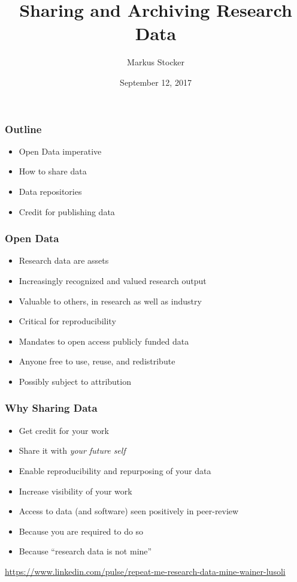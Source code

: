 \documentclass{beamer}
\title{Sharing and Archiving Research Data}
\author{Markus Stocker}
\date{September 12, 2017}
\begin{document}
\maketitle

\begin{frame}
  \frametitle{Outline}
  
  \begin{itemize}
  \item Open Data imperative
  \item How to share data
  \item Data repositories
  \item Credit for publishing data
  \end{itemize}
\end{frame}

\begin{frame}
  \frametitle{Open Data}
  
  \begin{itemize}
  \item Research data are assets
  \item Increasingly recognized and valued research output	
  \item Valuable to others, in research as well as industry
  \item Critical for reproducibility
  \item Mandates to open access publicly funded data
  \item Anyone free to use, reuse, and redistribute
  \item Possibly subject to attribution
  \end{itemize}
\end{frame}

\begin{frame}
  \frametitle{Why Sharing Data}
  
  \begin{itemize}
  \item Get credit for your work
  \item Share it with \emph{your future self}
  \item Enable reproducibility and repurposing of your data
  \item Increase visibility of your work
  \item Access to data (and software) seen positively in peer-review
  \item Because you are required to do so
  \item Because ``research data is not mine''
  \end{itemize}
  \tiny
  \begin{flushright}
  \url{https://www.linkedin.com/pulse/repeat-me-research-data-mine-wainer-lusoli}
  \end{flushright}
\end{frame}
\end{document}
